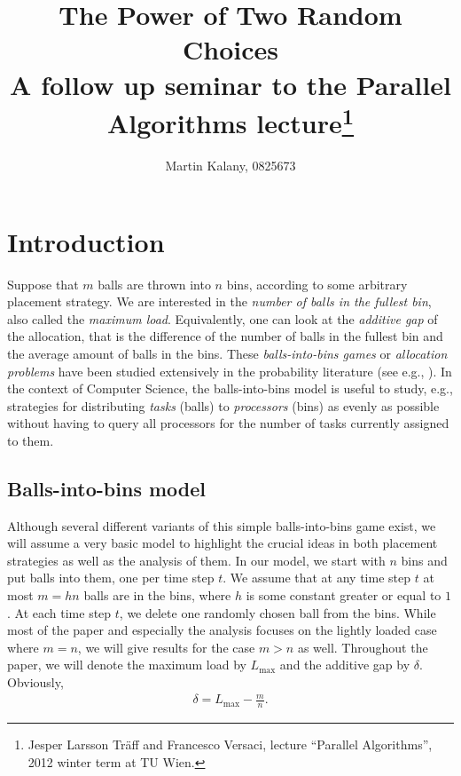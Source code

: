 \documentclass[a4paper,12pt]{article}
\newcommand\load{L_{\mathrm{max}}}
\begin{document}
\title{The Power of Two Random Choices\\ 
\large A follow up seminar to the Parallel Algorithms lecture\footnote{Jesper Larsson Tr\"aff and Francesco Versaci, lecture ``Parallel Algorithms'', 2012 winter term at TU Wien.}}
\author{Martin Kalany, 0825673}

\maketitle
\begin{abstract}

\end{abstract}

\section{Introduction}
\label{sec:intro}
Suppose that $m$ balls are thrown into $n$ bins, according to some arbitrary placement strategy. We are interested in the \emph{number of balls in the fullest bin}, also called the \emph{maximum load}. Equivalently, one can look at the \emph{additive gap} of the allocation, that is the difference of the number of balls in the fullest bin and the average amount of balls in the bins. These \emph{balls-into-bins games} or \emph{allocation problems} have been studied extensively in the probability literature (see e.g., \cite{JK77}). In the context of Computer Science, the balls-into-bins model is useful to study, e.g., strategies for distributing \emph{tasks} (balls) to \emph{processors} (bins) as evenly as possible without having to query all processors for the number of tasks currently assigned to them.

\subsection{Balls-into-bins model}
\label{sec:model}
Although several different variants of this simple balls-into-bins game exist, we will assume a very basic model to highlight the crucial ideas in both placement strategies as well as the analysis of them. In our model, we start with $n$ bins and put balls into them, one per time step $t$. We assume that at any time step $t$ at most $m = h n$ balls are in the bins, where $h$ is some constant greater or equal to $1$. At each time step $t$, we delete one randomly chosen ball from the bins. While most of the paper and especially the analysis focuses on the lightly loaded case where $m=n$, we will give results for the case $m > n$ as well. Throughout the paper, we will denote the maximum load by $\load$ and the additive gap by $\delta$. Obviously, 
\begin{align}
\delta = \load - \frac{m}{n}.
\end{align}
\end{document}
